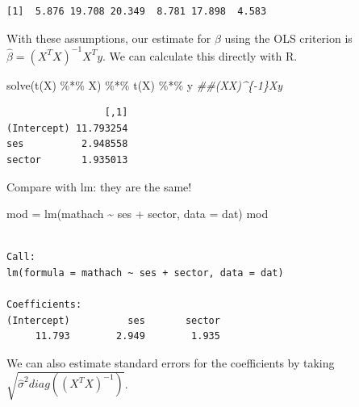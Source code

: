 \documentclass[
  letterpaper,
  DIV=11,
  numbers=noendperiod]{scrreprt}
\newenvironment{Shaded}{}{}
\newcommand{\AttributeTok}[1]{\textcolor[rgb]{0.49,0.56,0.16}{#1}}
\newcommand{\DocumentationTok}[1]{\textcolor[rgb]{0.73,0.13,0.13}{\textit{#1}}}
\newcommand{\FunctionTok}[1]{\textcolor[rgb]{0.02,0.16,0.49}{#1}}
\newcommand{\NormalTok}[1]{#1}
\newcommand{\OtherTok}[1]{\textcolor[rgb]{0.00,0.44,0.13}{#1}}
\newcommand{\SpecialCharTok}[1]{\textcolor[rgb]{0.25,0.44,0.63}{#1}}
\begin{document}
\begin{verbatim}
[1]  5.876 19.708 20.349  8.781 17.898  4.583
\end{verbatim}

With these assumptions, our estimate for \(\beta\) using the OLS
criterion is \(\hat{\beta} = (X^TX)^{-1}X^Ty\). We can calculate this
directly with R.

\begin{Shaded}
\begin{Highlighting}[]
\FunctionTok{solve}\NormalTok{(}\FunctionTok{t}\NormalTok{(X) }\SpecialCharTok{\%*\%}\NormalTok{ X) }\SpecialCharTok{\%*\%} \FunctionTok{t}\NormalTok{(X) }\SpecialCharTok{\%*\%}\NormalTok{ y }\DocumentationTok{\#\#(X\textquotesingle{}X)\^{}\{{-}1\}X\textquotesingle{}y}
\end{Highlighting}
\end{Shaded}

\begin{verbatim}
                 [,1]
(Intercept) 11.793254
ses          2.948558
sector       1.935013
\end{verbatim}

Compare with lm: they are the same!

\begin{Shaded}
\begin{Highlighting}[]
\NormalTok{mod }\OtherTok{=} \FunctionTok{lm}\NormalTok{(mathach }\SpecialCharTok{\textasciitilde{}}\NormalTok{ ses }\SpecialCharTok{+}\NormalTok{ sector, }\AttributeTok{data =}\NormalTok{ dat)}
\NormalTok{mod }
\end{Highlighting}
\end{Shaded}

\begin{verbatim}

Call:
lm(formula = mathach ~ ses + sector, data = dat)

Coefficients:
(Intercept)          ses       sector  
     11.793        2.949        1.935  
\end{verbatim}

We can also estimate standard errors for the coefficients by taking
\(\sqrt{\hat{\sigma}^2diag((X^TX)^{-1})}\).
\end{document}
